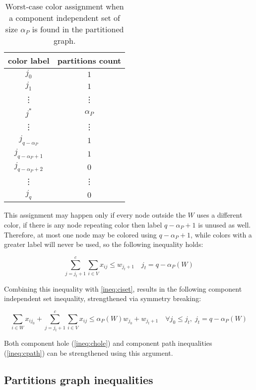 \begin{table}
\centering	
\begin{tabular}{cc}
\hline
\textbf{color label} & \textbf{partitions count} \\
\hline
$j_0$ & $1$\\
$j_1$ & $1$\\
\vdots & \vdots \\
$j^*$ & $\alpha_P$ \\
\vdots & \vdots \\
$j_{q - \alpha_P}$ & $1$\\
$j_{q - \alpha_P + 1}$ & $1$\\
$j_{q - \alpha_P + 2}$ & $0$\\
\vdots & \vdots \\
$j_{q}$ & $0$\\
\hline
\end{tabular}
\caption{Worst-case color assignment when a component independent set of size $\alpha_P$ is found in the partitioned graph.}
	\label{table:cisetcoloring}
\end{table}

This assignment may happen only if every node outside the $W$ uses a different color, if there is any node repeating color then label $q - \alpha_P + 1$ is unused as well. Therefore, at most one node may be colored using $q - \alpha_P + 1$, while colors with a greater label will never be used, so the following inequality holds:

\begin{equation}
\label{ineq:cisetbshigh}
\sum ^c _{j = j_t + 1} \sum _{i \in V} x_{ij} \leq w_{j_t + 1} \quad j_t = q - \alpha_P(W)
\end{equation}

Combining this inequality with \ref{ineq:ciset}, results in the following component independent set inequality, strengthened via symmetry breaking:

\begin{equation}
\label{ineq:cisetbs}
\sum_{i \in W} x_{ij_0} + \sum ^c _{j = j_t + 1} \sum _{i \in V} x_{ij} \leq \alpha_P(W) w_{j_0} + w_{j_t + 1} \quad \forall j_0 \leq j_t, \; j_t = q - \alpha_P(W)
\end{equation}

Both component hole (\ref{ineq:chole}) and component path inequalities (\ref{ineq:cpath}) can be strengthened using this argument.

\subsection{Partitions graph inequalities}

